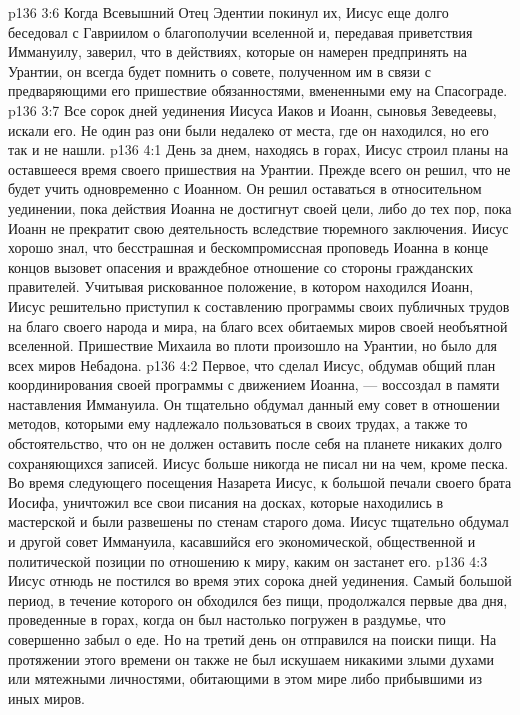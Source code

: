 \vs p136 3:6 Когда Всевышний Отец Эдентии покинул их, Иисус еще долго беседовал с Гавриилом о благополучии вселенной и, передавая приветствия Иммануилу, заверил, что в действиях, которые он намерен предпринять на Урантии, он всегда будет помнить о совете, полученном им в связи с предваряющими его пришествие обязанностями, вмененными ему на Спасограде.
\vs p136 3:7 \pc Все сорок дней уединения Иисуса Иаков и Иоанн, сыновья Зеведеевы, искали его. Не один раз они были недалеко от места, где он находился, но его так и не нашли.
\vs p136 4:1 День за днем, находясь в горах, Иисус строил планы на оставшееся время своего пришествия на Урантии. Прежде всего он решил, что не будет учить одновременно с Иоанном. Он решил оставаться в относительном уединении, пока действия Иоанна не достигнут своей цели, либо до тех пор, пока Иоанн не прекратит свою деятельность вследствие тюремного заключения. Иисус хорошо знал, что бесстрашная и бескомпромиссная проповедь Иоанна в конце концов вызовет опасения и враждебное отношение со стороны гражданских правителей. Учитывая рискованное положение, в котором находился Иоанн, Иисус решительно приступил к составлению программы своих публичных трудов на благо своего народа и мира, на благо всех обитаемых миров своей необъятной вселенной. Пришествие Михаила во плоти произошло на Урантии, но было для всех миров Небадона.
\vs p136 4:2 Первое, что сделал Иисус, обдумав общий план координирования своей программы с движением Иоанна, --- воссоздал в памяти наставления Иммануила. Он тщательно обдумал данный ему совет в отношении методов, которыми ему надлежало пользоваться в своих трудах, а также то обстоятельство, что он не должен оставить после себя на планете никаких долго сохраняющихся записей. Иисус больше никогда не писал ни на чем, кроме песка. Во время следующего посещения Назарета Иисус, к большой печали своего брата Иосифа, уничтожил все свои писания на досках, которые находились в мастерской и были развешены по стенам старого дома. Иисус тщательно обдумал и другой совет Иммануила, касавшийся его экономической, общественной и политической позиции по отношению к миру, каким он застанет его.
\vs p136 4:3 \pc Иисус отнюдь не постился во время этих сорока дней уединения. Самый большой период, в течение которого он обходился без пищи, продолжался первые два дня, проведенные в горах, когда он был настолько погружен в раздумье, что совершенно забыл о еде. Но на третий день он отправился на поиски пищи. На протяжении этого времени он также не был искушаем никакими злыми духами или мятежными личностями, обитающими в этом мире либо прибывшими из иных миров.
